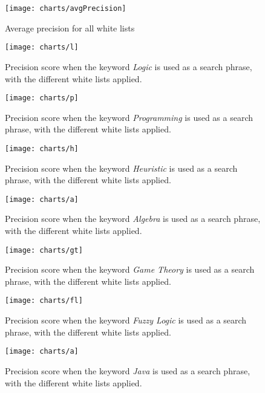 
\begin{figure}[h] 
\caption{Average precision for all white lists}
\texttt{[image: charts/avgPrecision]}
\label{fig:avgPrecision}
\end{figure}

\begin{figure}[h] 
\caption{Precision score when the keyword \textit{Logic} is used as a search phrase, with the different white lists applied.}
\texttt{[image: charts/l]}
\label{fig:l}
\end{figure}

\begin{figure}[h] 
\caption{Precision score when the keyword \textit{Programming} is used as a search phrase, with the different white lists applied.}
\texttt{[image: charts/p]}
\label{fig:p}
\end{figure}

\begin{figure}[h] 
\caption{Precision score when the keyword \textit{Heuristic} is used as a search phrase, with the different white lists applied.}
\texttt{[image: charts/h]}
\label{fig:h}
\end{figure}

\begin{figure}[h] 
\caption{Precision score when the keyword \textit{Algebra} is used as a search phrase, with the different white lists applied.}
\texttt{[image: charts/a]}
\label{fig:a}
\end{figure}

\begin{figure}[h] 
\caption{Precision score when the keyword \textit{Game Theory} is used as a search phrase, with the different white lists applied.}
\texttt{[image: charts/gt]}
\label{fig:gt}
\end{figure}

\begin{figure}[h] 
\caption{Precision score when the keyword \textit{Fuzzy Logic} is used as a search phrase, with the different white lists applied.}
\texttt{[image: charts/fl]}
\label{fig:fl}
\end{figure}

\begin{figure}[h] 
\caption{Precision score when the keyword \textit{Java} is used as a search phrase, with the different white lists applied.}
\texttt{[image: charts/a]}
\label{fig:a}
\end{figure}

